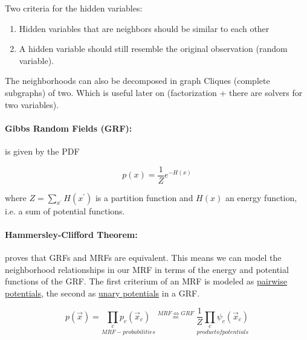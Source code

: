 Two criteria for the hidden variables: 
\begin{enumerate}
	\item Hidden variables that are neighbors should be similar to each other 
	\item A hidden variable should still resemble the original observation (random variable).	
\end{enumerate}

The neighborhoods can also be decomposed in graph Cliques (complete subgraphs) of two. Which is useful later on (factorization + there are solvers for two variables).

\paragraph{Gibbs Random Fields (GRF):} is given by the PDF

\begin{equation*}
	p(x) = \frac{1}{Z} e^{-H(x)}
\end{equation*}

where $Z = \sum_{x^\prime} H(x^{\prime})$ is a partition function and $H(x)$ an energy function, i.e. a sum of potential functions.

%
%
%

\paragraph{Hammersley-Clifford Theorem:} proves that GRFs and MRFs are equivalent. This means we can model the neighborhood relationships in our MRF in terms of the energy and potential functions of the GRF. The first criterium of an MRF is modeled as \underline{pairwise potentials}, the second as \underline{unary potentials} in a GRF.

\begin{equation*}
	p(\vec{x}) = \underset{MRF-probabilities}{\prod_c p_c(\vec{x}_c)} \overset{MRF \Leftrightarrow GRF}{=} \underset{product of potentials}{\dfrac{1}{Z}\prod_c \psi_c(\vec{x}_c)} 
\end{equation*}

